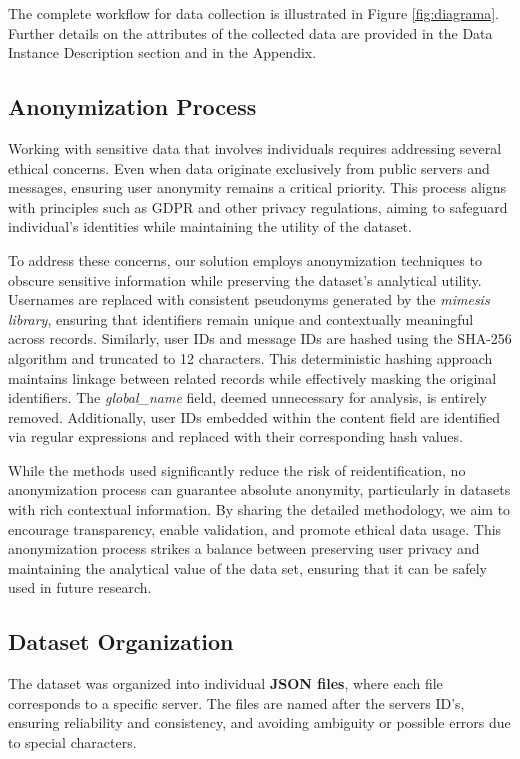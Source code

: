 The complete workflow for data collection is illustrated in Figure \ref{fig:diagrama}. Further details on the attributes of the collected data are provided in the Data Instance Description section and in the Appendix.

\subsection{Anonymization Process}

Working with sensitive data that involves individuals requires addressing several ethical concerns. Even when data originate exclusively from public servers and messages, ensuring user anonymity remains a critical priority. This process aligns with principles such as GDPR and other privacy regulations, aiming to safeguard individual's identities while maintaining the utility of the dataset.

To address these concerns, our solution employs anonymization techniques to obscure sensitive information while preserving the dataset's analytical utility. Usernames are replaced with consistent pseudonyms generated by the \textit{mimesis library}, ensuring that identifiers remain unique and contextually meaningful across records. Similarly, user IDs and message IDs are hashed using the SHA-256 algorithm and truncated to 12 characters. This deterministic hashing approach maintains linkage between related records while effectively masking the original identifiers. The \textit{global\_name} field, deemed unnecessary for analysis, is entirely removed. Additionally, user IDs embedded within the content field are identified via regular expressions and replaced with their corresponding hash values. 

While the methods used significantly reduce the risk of reidentification, no anonymization process can guarantee absolute anonymity, particularly in datasets with rich contextual information. By sharing the detailed methodology, we aim to encourage transparency, enable validation, and promote ethical data usage. This anonymization process strikes a balance between preserving user privacy and maintaining the analytical value of the data set, ensuring that it can be safely used in future research.

\subsection{Dataset Organization}

The dataset was organized into individual \textbf{JSON files}, where each file corresponds to a specific server. The files are named after the servers ID's, ensuring reliability and consistency, and avoiding ambiguity or possible errors due to special characters.

